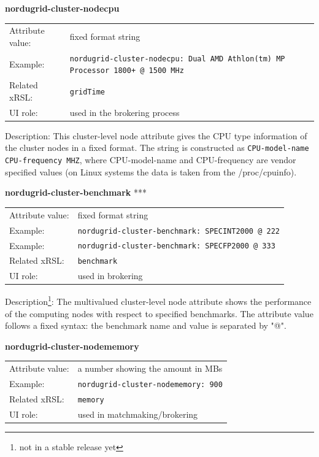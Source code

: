 \documentclass{article}
\begin{document}
  \hspace*{0.5cm}
  \begin{shaded}
    \textbf{nordugrid-cluster-nodecpu}
  \end{shaded}
  \begin{tabular}{lp{10cm}}  
    Attribute value:& fixed format string\\
    Example:& \verb#nordugrid-cluster-nodecpu: Dual AMD Athlon(tm) MP Processor 1800+ @ 1500 MHz#\\
    Related xRSL:& \verb#gridTime#\\
    UI role:& used in the brokering process\\
  \end{tabular}

Description: This cluster-level node attribute gives the CPU type information of the cluster nodes
in a fixed format. The string is constructed as \verb#CPU-model-name CPU-frequency MHZ#,
where CPU-model-name and CPU-frequency are vendor specified values (on Linux systems 
the data is taken from the /proc/cpuinfo).


  \hspace*{0.5cm}
  \begin{shaded}
    \textbf{nordugrid-cluster-benchmark} ***
  \end{shaded}
  \begin{tabular}{lp{10cm}}  
    Attribute value:& fixed format string\\
    Example:& \verb#nordugrid-cluster-benchmark: SPECINT2000 @ 222#\\
    Example:& \verb#nordugrid-cluster-benchmark: SPECFP2000 @ 333#\\
    Related xRSL:& \verb#benchmark#\\
    UI role:& used in brokering\\
  \end{tabular}

Description\footnote{not in a stable release yet}: The multivalued cluster-level node attribute shows the 
performance of the computing nodes with respect to specified benchmarks.
The attribute value follows a fixed syntax: the benchmark name 
and value is separated by "@".


  \hspace*{0.5cm}
  \begin{shaded}
    \textbf{nordugrid-cluster-nodememory}
  \end{shaded}
  \begin{tabular}{lp{10cm}}  
    Attribute value:& a number showing the amount in MBs\\
    Example:& \verb#nordugrid-cluster-nodememory: 900#\\
    Related xRSL:& \verb#memory#\\
    UI role:& used in matchmaking/brokering\\
  \end{tabular}
\end{document}
